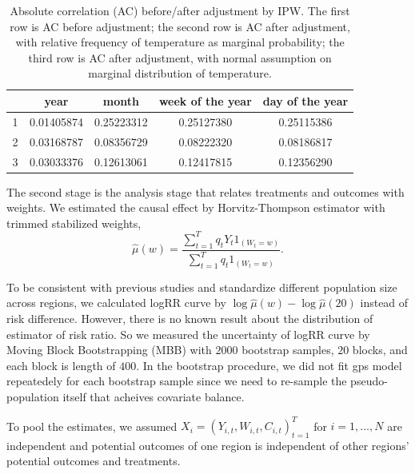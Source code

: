\documentclass[12pt]{article}
\begin{document}
\begin{table}[ht]
	\centering
\begin{tabular}{|| c || c | c | c | c || }
	\hline\hline
	\ & year & month & week of the year & day of the year \\
	\hline
	1 & 0.01405874 & 0.25223312 & 0.25127380 & 0.25115386 \\ %
	\hline
	2 & 0.03168787 & 0.08356729 & 0.08222320 & 0.08186817 \\ %
	\hline
	3 & 0.03033376 & 0.12613061 & 0.12417815 & 0.12356290 \\ %
	\hline\hline
	
\end{tabular}
\caption{
	Absolute correlation (AC) before/after adjustment by IPW.
	The first row is AC before adjustment;
	the second row is AC after adjustment, 
	with relative frequency of temperature as marginal probability;
	the third row is AC after adjustment, 
	with normal assumption on marginal distribution of temperature.}
\label{table:AC}
\end{table}

The second stage is the analysis stage that relates treatments and outcomes with weights.
We estimated the causal effect by Horvitz-Thompson estimator with trimmed stabilized weights,
\[
	\hat{\mu}(w) = \frac{\sum_{t = 1}^T q_t Y_t 1_{(W_t = w)}}{\sum_{t = 1}^T q_t 1_{(W_t = w)}}.
\]

To be consistent with previous studies and standardize different population size across regions,
we calculated logRR curve by $\log\hat{\mu}(w) - \log \hat{\mu}(20)$ instead of risk difference.
However, there is no known result about the distribution of estimator of risk ratio.
So we measured the uncertainty of logRR curve by Moving Block Bootstrapping (MBB)\cite{mbb1989}
with $2000$ bootstrap samples, $20$ blocks, and each block is length of $400$.
In the bootstrap procedure, we did not fit gps model repeatedely for each bootstrap sample
since we need to re-sample the pseudo-population itself that acheives covariate balance.

To pool the estimates,
we assumed $X_i = (Y_{i,t}, W_{i,t}, C_{i,t})_{t = 1}^T$ for $i = 1, \dots, N$ are independent
and potential outcomes of one region is independent of other regions' potential outcomes and treatments.
\end{document}
